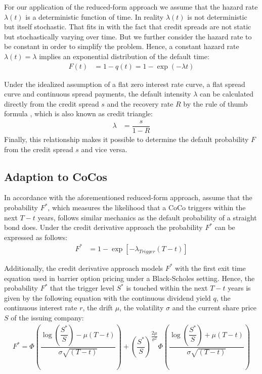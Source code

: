 For our application of the reduced-form approach we assume that the hazard rate $\lambda(t)$ is a deterministic function of time. In reality $\lambda(t)$ is not deterministic but itself stochastic. That fits in with the fact that credit spreads are not static but stochastically varying over time. \citep{lectureschmidt} But we further consider the hazard rate to be constant in order to simplify the problem. Hence, a constant hazard rate $\lambda(t) = \lambda$ implies an exponential distribution of the default time:
\begin{align} \label{bonddefaultprob}
F(t) &=  1 - q(t) = 1 - \exp (- \lambda t)
\end{align}

Under the idealized assumption of a flat zero interest rate curve, a flat spread curve and continuous spread payments, the default intensity $\lambda$ can be calculated directly from the credit spread $s$ and the recovery rate $R$ by the rule of thumb formula \citep{lectureschmidt}, which is also known as credit triangle: 
\begin{align}
\lambda &= \dfrac{s}{1 - R}
\end{align}
Finally, this relationship makes it possible to determine the default probability $F$ from the credit spread $s$ and vice versa.

\subsection{Adaption to CoCos}
In accordance with the aforementioned reduced-form approach, \citet{de2011pricing} assume that the probability $F^*$, which measures the likelihood that a CoCo triggers within the next $T - t$ years, follows similar mechanics as the default probability of a straight bond does. Under the credit derivative approach the probability $F^*$ can be expressed as follows:
\begin{align} \label{cocodefaultprob}
    F^* &= 1 - \exp\left[- \lambda_{Trigger} (T-t)\right]
\end{align}

Additionally, the credit derivative approach models $F^*$ with the first exit time equation used in barrier option pricing under a Black-Scholes setting. \citep{su2009likely} Hence, the probability $F^*$ that the trigger level $S^*$ is touched within the next $T - t$ years is given by the following equation with the continuous dividend yield $q$, the continuous interest rate $r$, the drift $\mu$, the volatility $\sigma$ and the current share price $S$ of the issuing company: 
\begin{align}
    F^* = \Phi\left( \dfrac{\log \left(\dfrac{S^*}{S}\right) - \mu (T - t)}{\sigma \sqrt{(T - t)}}\right) + \left(\dfrac{S^*}{S}\right)^{\dfrac{2 \mu}{\sigma^2}} \Phi\left( \dfrac{\log \left(\dfrac{S^*}{S}\right) + \mu (T - t)}{\sigma \sqrt{(T - t)}}\right)
\end{align}

